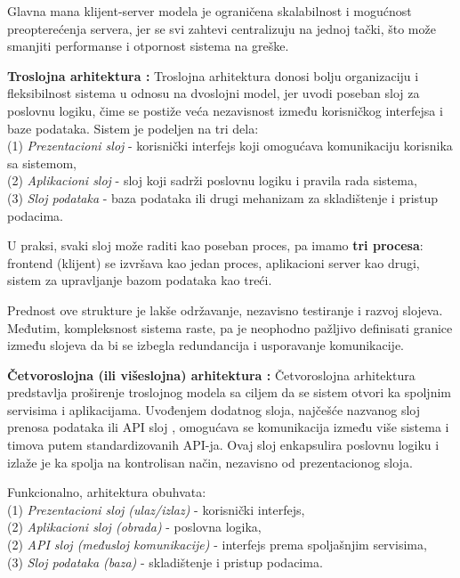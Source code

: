 \begin{description}
Glavna mana klijent-server modela je ograničena skalabilnost i mogućnost preopterećenja servera, jer se svi zahtevi centralizuju na jednoj tački, što može smanjiti performanse i otpornost sistema na greške.

\item \textbf{Troslojna arhitektura \cite{helal2001three}:} 
Troslojna arhitektura donosi bolju organizaciju i fleksibilnost sistema u odnosu na dvoslojni model, jer uvodi poseban sloj za poslovnu logiku, čime se postiže veća nezavisnost između korisničkog interfejsa i baze podataka. Sistem je podeljen na tri dela:\\
(1) \textit{Prezentacioni sloj} - korisnički interfejs koji omogućava komunikaciju korisnika sa sistemom,\\
(2) \textit{Aplikacioni sloj} - sloj koji sadrži poslovnu logiku i pravila rada sistema,\\
(3) \textit{Sloj podataka} - baza podataka ili drugi mehanizam za skladištenje i pristup podacima.

U praksi, svaki sloj može raditi kao poseban proces, pa imamo \textbf{tri procesa}: frontend (klijent) se izvršava kao jedan proces, aplikacioni server kao drugi, sistem za upravljanje bazom podataka kao treći.

Prednost ove strukture je lakše održavanje, nezavisno testiranje i razvoj slojeva. Međutim, kompleksnost sistema raste, pa je neophodno pažljivo definisati granice između slojeva da bi se izbegla redundancija i usporavanje komunikacije.

\item \textbf{Četvoroslojna (ili višeslojna) arhitektura \cite{cao2013research}:}  
Četvoroslojna arhitektura predstavlja proširenje troslojnog modela sa ciljem da se sistem otvori ka spoljnim servisima i aplikacijama. Uvođenjem dodatnog sloja, najčešće nazvanog sloj prenosa podataka  ili API sloj , omogućava se komunikacija između više sistema i timova putem standardizovanih API-ja. Ovaj sloj enkapsulira poslovnu logiku i izlaže je ka spolja na kontrolisan način, nezavisno od prezentacionog sloja.

Funkcionalno, arhitektura obuhvata:\\
(1) \textit{Prezentacioni sloj (ulaz/izlaz)} - korisnički interfejs,\\
(2) \textit{Aplikacioni sloj (obrada)} - poslovna logika,\\
(2) \textit{API sloj (međusloj komunikacije)} - interfejs prema spoljašnjim servisima,\\
(3) \textit{Sloj podataka (baza)} - skladištenje i pristup podacima.


\end{description}
